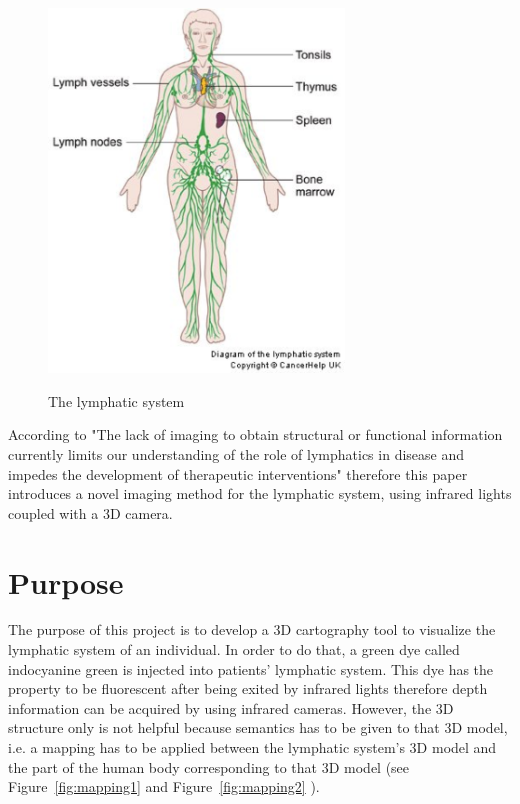 \begin{figure}[h]
\caption{The lymphatic system}
\centering
    \includegraphics[width=0.7\textwidth]{images/LymphaticSystem.png}
\label{fig:The lymphatic system}
\end{figure}


According to \cite{marshall_near-infrared_2010}  "The lack of imaging to obtain structural or functional information currently limits our understanding of the role of lymphatics in disease and impedes the development of therapeutic interventions" therefore this paper introduces a novel imaging method for the lymphatic system, using infrared lights coupled with a 3D camera.

\section{Purpose}

The purpose of this project is to develop a 3D cartography tool to visualize the lymphatic system of an individual. In order to do that, a green dye called indocyanine green is injected into patients' lymphatic system. This dye has the property to be fluorescent after being exited by infrared lights therefore depth information can be acquired by using infrared cameras. However, the 3D structure only is not helpful because semantics has to be given to that 3D model, i.e. a mapping has to be applied between the lymphatic system's 3D model and the part of the human body corresponding to that 3D model (see Figure~\ref{fig:mapping1} and Figure~\ref{fig:mapping2} \cite{gianluca}). 

